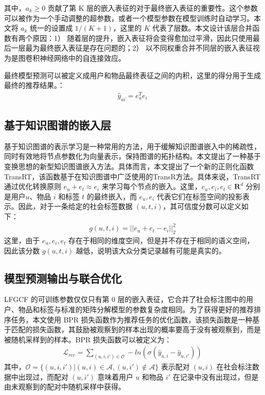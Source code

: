 其中，$a_k \geq 0$ 贡献了第 K 层的嵌入表征的对于最终嵌入表征的重要性。这个参数可以被作为一个手动调整的超参数，或者一个模型参数在模型训练时自动学习。本文将 $a_k$ 统一的设置成 $1/(K + 1)$，这里的 $K$ 代表了层数。本文设计该层合并函数有两个原因：1） 随着层的提升，嵌入表征将会变得愈加过平滑\cite{li_deeper_2018}，因此只使用最后一层最为最终嵌入表征是存在问题的；2） 以不同权重合并不同层的嵌入表征视为是图卷积神经网络中的自连接效应\cite{he_lightgcn_2020}。

最终模型预测可以被定义成用户和物品最终表征之间的内积，这里的得分用于生成最终的推荐结果。：
\begin{gather}
    \hat{y}_{ui} = e_u^{T}e_i
\end{gather}


\subsection{基于知识图谱的嵌入层}
基于知识图谱的表示学习是一种常用的方法，用于缓解知识图谱嵌入中的稀疏性，同时有效地将节点参数化为向量表示，保持图谱的拓扑结构。本文提出了一种基于变换思想的新型知识图谱嵌入方法。具体而言，本文提出了一个新的正则化函数 TransRT，该函数基于在知识图谱中广泛使用的TransR方法\cite{lin_learning_nodate}。具体来说，TransRT 通过优化转换原则 $e_u + e_t \approx e_i$ 来学习每个节点的嵌入。这里，$e_u, e_i, e_t \in \mathbf{R}^d$ 分别是用户$u$、物品 $i$ 和标签 $t$ 的最终嵌入，而 $e_u, e_i$ 代表它们在标签空间的投影表示。因此，对于一条给定的社会标签数据 $(u, t, i)$，其可信度分数可以定义如下：
\begin{gather}
    g(u, t, i) = ||e_u + e_t - e_i||_2^2
\end{gather}
这里，由于 $e_u, e_i, e_t$ 存在于相同的维度空间，但是并不存在于相同的语义空间，因此该分数 $g(u, t, i)$ 越低，说明该大众分类记录越有可能是真实的。

\subsection{模型预测输出与联合优化}
LFGCF 的可训练参数仅仅只有第 0 层的嵌入表征，它合并了社会标注图中的用户、物品和标签与标准的矩阵分解模型的参数复杂度相同。为了获得更好的推荐排序任务，本文使用 BPR 损失函数作为推荐任务的优化函数，该损失函数是一种基于匹配的损失函数，其鼓励被观察到的样本出现的概率要高于没有被观察到，而是被随机采样到的样本。BPR 损失函数可以被定义为：
\begin{gather}
    \mathcal{L}_{rec} = \sum_{(u,i,i') \in \mathcal{O}} -ln(\sigma(\hat{y}_{u,i} - \hat{y}_{u,i'}))
\end{gather}
其中，$\mathcal{O} = \{(u,i,i')|(u,i) \in \mathcal{A},(u,i') \notin \mathcal{A}\}$ 表示配对 $(u,i)$ 在社会标注数据中出现过，而配对 $(u,i')$ 意味着用户 $u$ 和物品 $i'$ 在记录中没有出现过，但是由未观察到的配对中随机采样中获得。

